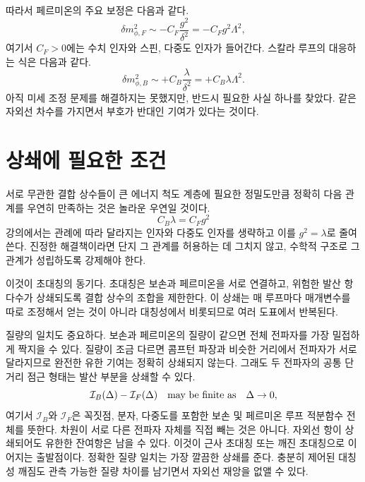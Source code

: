 \begin{classroomqa}
\end{classroomqa}

따라서 페르미온의 주요 보정은 다음과 같다.
\begin{equation}
\delta m_{\phi,F}^2
\sim -C_F\frac{g^2}{\delta^2}
=-C_Fg^2\Lambda^2,
\end{equation}
여기서 \(C_F>0\)에는 수치 인자와 스핀, 다중도 인자가 들어간다. 스칼라 루프의 대응하는 식은 다음과 같다.
\begin{equation}
\delta m_{\phi,B}^2
\sim+C_B\frac{\lambda}{\delta^2}
=+C_B\lambda\Lambda^2.
\end{equation}
아직 미세 조정 문제를 해결하지는 못했지만, 반드시 필요한 사실 하나를 찾았다. 같은 자외선 차수를 가지면서 부호가 반대인 기여가 있다는 것이다.

\section{상쇄에 필요한 조건}

서로 무관한 결합 상수들이 큰 에너지 척도 계층에 필요한 정밀도만큼 정확히 다음 관계를 우연히 만족하는 것은 놀라운 우연일 것이다.
\begin{equation}
C_B\lambda=C_Fg^2
\end{equation}
강의에서는 관례에 따라 달라지는 인자와 다중도 인자를 생략하고 이를 \(g^2=\lambda\)로 줄여 쓴다. 진정한 해결책이라면 단지 그 관계를 허용하는 데 그치지 않고, 수학적 구조로 그 관계가 성립하도록 강제해야 한다.

이것이 초대칭의 동기다. 초대칭은 보손과 페르미온을 서로 연결하고, 위험한 발산 항 다수가 상쇄되도록 결합 상수의 조합을 제한한다. 이 상쇄는 매 루프마다 매개변수를 따로 조정해서 얻는 것이 아니라 대칭성에서 비롯되므로 여러 도표에서 반복된다.

질량의 일치도 중요하다. 보손과 페르미온의 질량이 같으면 전체 전파자를 가장 밀접하게 짝지을 수 있다. 질량이 조금 다르면 콤프턴 파장과 비슷한 거리에서 전파자가 서로 달라지므로 완전한 유한 기여는 정확히 상쇄되지 않는다. 그래도 두 전파자의 공통 단거리 점근 형태는 발산 부분을 상쇄할 수 있다.
\begin{equation}
\mathcal I_B(\Delta)-\mathcal I_F(\Delta)
\quad\hbox{may be finite as}\quad \Delta\to0,
\end{equation}
여기서 \(\mathcal I_B\)와 \(\mathcal I_F\)은 꼭짓점, 분자, 다중도를 포함한 보손 및 페르미온 루프 적분함수 전체를 뜻한다. 차원이 서로 다른 전파자 자체를 직접 빼는 것은 아니다. 자외선 항이 상쇄되어도 유한한 잔여항은 남을 수 있다. 이것이 근사 초대칭 또는 깨진 초대칭으로 이어지는 출발점이다. 정확한 질량 일치는 가장 깔끔한 상쇄를 준다. 충분히 제어된 대칭성 깨짐도 관측 가능한 질량 차이를 남기면서 자외선 재앙을 없앨 수 있다.

